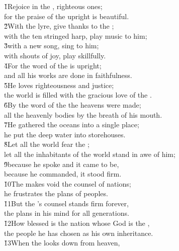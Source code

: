 \begin{poetry}
\poeml \v{1}Rejoice in the , righteous ones; \\
\poemll    for the praise of the upright is beautiful. \\
\poeml \v{2}With the lyre, give thanks to the ; \\
\poemll    with the ten stringed harp, play music to him; \\
\poeml \v{3}with a new song, sing to him; \\
\poemll    with shouts of joy, play skillfully. \\
\poeml \v{4}For the word of the  is upright; \\
\poemll    and all his works are done in faithfulness. \\
\poeml \v{5}He loves righteousness and justice; \\
\poemll    the world is filled with the gracious love of the . \\
\poeml \v{6}By the word of the  the heavens were made; \\
\poemll    all the heavenly bodies by the breath of his mouth. \\
\poeml \v{7}He gathered the oceans into a single place; \\
\poemll    he put the deep water into storehouses. \\
\poeml \v{8}Let all the world fear the ; \\
\poemll    let all the inhabitants of the world stand in awe of him; \\
\poeml \v{9}because he spoke and it came to be, \\
\poemll    because he commanded, it stood firm. \\
\poeml \v{10}The  makes void the counsel of nations; \\
\poemll    he frustrates the plans of peoples. \\
\poeml \v{11}But the 's counsel stands firm forever, \\
\poemll    the plans in his mind for all generations. \\
\poeml \v{12}How blessed is the nation whose God is the , \\
\poemll    the people he has chosen as his own inheritance. \\
\poeml \v{13}When the  looks down from heaven, \\

\end{poetry}
